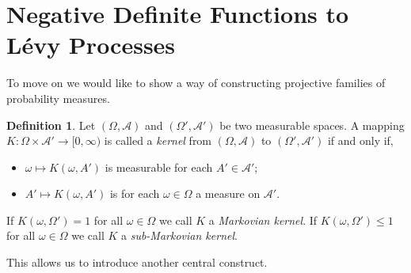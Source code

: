 \documentclass[a4paper, 12pt]{report}
\theoremstyle{cor}
\theoremstyle{remark}
\theoremstyle{definition}
\newtheorem{defn}[theorem]{Definition}
\begin{document}
\section{Negative Definite Functions to L\'evy Processes}\label{Se.NDFtLP}

To move on we would like to show a way of constructing projective families of probability measures.

\begin{defn}
Let $(\Omega, \mathcal{A})$ and $(\Omega', \mathcal{A}')$ be two measurable spaces.  A mapping $K : \Omega \times \mathcal{A}' \to [0, \infty)$ is called a \emph{kernel} from $(\Omega, \mathcal{A})$ to $(\Omega', \mathcal{A}')$ if and only if,
\begin{itemize}
\item[Ki)] $\omega \mapsto K(\omega, A')$ is measurable for each $A' \in \mathcal{A}'$;

\item[Kii)] $A' \mapsto K(\omega, A')$ is for each $\omega \in \Omega$ a measure on $\mathcal{A}'$.
\end{itemize}
If $K(\omega, \Omega') = 1$ for all $\omega \in \Omega$ we call $K$ a \emph{Markovian kernel}.  If $K(\omega, \Omega') \le 1$ for all $\omega \in \Omega$ we call $K$ a \emph{sub-Markovian kernel}.
\end{defn}
This allows us to introduce another central construct.
\end{document}
